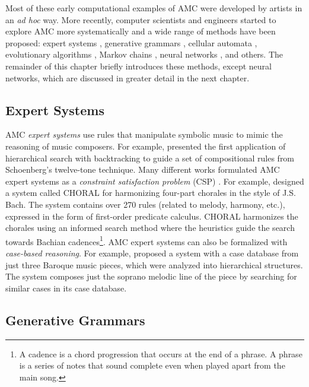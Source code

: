 Most of these early computational examples of AMC were developed by artists in an \textit{ad hoc} way. More recently, computer scientists and engineers started to explore AMC more systematically and a wide range of methods have been proposed: expert systems \cite{gill1963technique}, generative grammars \cite{cope1989experiments}, cellular automata \cite{miranda1993cellular}, evolutionary algorithms \cite{horner1991genetic}, Markov chains \cite{hild1992harmonet}, neural networks \cite{todd1989connectionist}, and others. The remainder of this chapter briefly introduces these methods, except neural networks, which are discussed in greater detail in the next chapter.

\subsection{Expert Systems}

AMC \textit{expert systems} use rules that manipulate symbolic music to mimic the reasoning of music composers. For example, \citet{gill1963technique} presented the first application of hierarchical search with backtracking to guide a set of compositional rules from Schoenberg’s twelve-tone technique. Many different works formulated AMC expert systems as a \textit{constraint satisfaction problem} (CSP) \cite{anders2011constraint}. For example, \citet{ebciouglu1988expert} designed a system called CHORAL for harmonizing four-part chorales in the style of J.S. Bach. The system contains over 270 rules (related to melody, harmony, etc.), expressed in the form of first-order predicate calculus. CHORAL harmonizes the chorales using an informed search method where the heuristics guide the search towards Bachian cadences\footnote{A cadence is a chord progression that occurs at the end of a phrase. A phrase is a series of notes that sound complete even when played apart from the main song.}. AMC expert systems can also be formalized with \textit{case-based reasoning}. For example, \citet{pereira1997composing} proposed a system with a case database from just three Baroque music pieces, which were analyzed into hierarchical structures. The system composes just the soprano melodic line of the piece by searching for similar cases in its case database.

\subsection{Generative Grammars}

